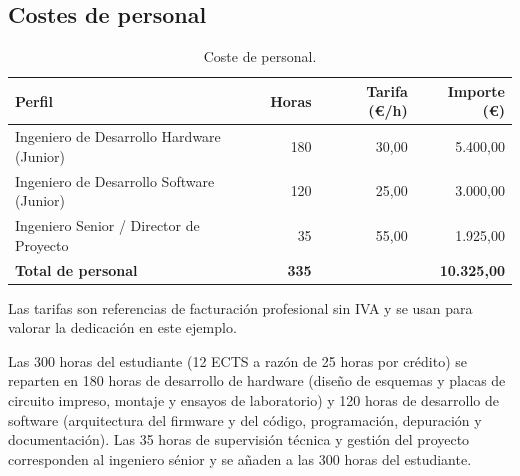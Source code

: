 \begin{samepage}
  \subsection{Costes de personal}
  \label{sec:presupuesto-mano}

  \begin{table}[H]
    \caption{Coste de personal.}
    \label{tab:recursos_humanos}
    \begin{tabularx}{\linewidth}{@{}>{\raggedright\arraybackslash}X r r r@{}}
      \hline
      \textbf{Perfil}                           & \textbf{Horas} & \textbf{Tarifa (€/h)} & \textbf{Importe (€)} \\
      \hline
      Ingeniero de Desarrollo Hardware (Junior) &            180 &                 30,00 &             5.400,00 \\
      Ingeniero de Desarrollo Software (Junior) &            120 &                 25,00 &             3.000,00 \\
      Ingeniero Senior / Director de Proyecto   &             35 &                 55,00 &             1.925,00 \\
      \hline
      \textbf{Total de personal}                &   \textbf{335} &                       &   \textbf{10.325,00} \\
      \hline
    \end{tabularx}
  \end{table}

  Las tarifas son referencias de facturación profesional sin IVA y se
  usan para valorar la dedicación en este ejemplo.

  Las 300 horas del estudiante (12 ECTS a razón de 25 horas por crédito)
  se reparten en 180 horas de desarrollo de hardware (diseño de esquemas y
  placas de circuito impreso, montaje y ensayos de laboratorio) y 120 horas
  de desarrollo de software (arquitectura del firmware y del código,
  programación, depuración y documentación). Las 35 horas de supervisión
  técnica y gestión del proyecto corresponden al ingeniero sénior y se
  añaden a las 300 horas del estudiante.
\end{samepage}
\pagebreak[0]


